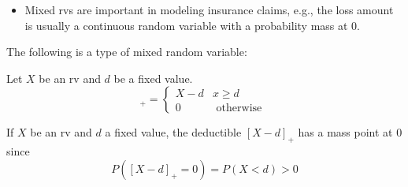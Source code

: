 \documentclass[notoc,notitlepage]{tufte-book}
\begin{document}
\begin{note}
  \begin{itemize}
    \item Mixed rvs are important in modeling insurance claims, e.g., the loss amount is usually a continuous random variable with a probability mass at $0$.
  \end{itemize}
\end{note}

The following is a type of mixed random variable:

\begin{defn}[Deductibles]
\label{defn:deductibles}
  Let $X$ be an rv and $d$ be a fixed value.
  \begin{equation*}
    [ X - d ]_+ = \begin{cases}
      X - d & x \geq d \\
      0     & \text{ otherwise }
    \end{cases}
  \end{equation*}
\end{defn}

\begin{note}
  If $X$ be an rv and $d$ a fixed value, the deductible $[X - d]_+$ has a mass point at $0$ since
  \begin{equation*}
    P( [ X - d ]_+ = 0 ) = P(X < d) > 0
  \end{equation*}
\end{note}
\end{document}
